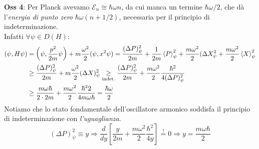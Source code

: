 \documentclass[../../FisicaTeorica.tex]{subfiles}
\begin{document}
\begin{enumerate}
\textbf{Oss 4}: Per Planck avevamo $\mathcal{E}_n \cong \hbar \omega n$, da cui manca un termine $\hbar \omega/2$, che dà l'\textit{energia di punto zero} $\hbar \omega (n+1/2)$, necessaria per il principio di indeterminazione.\\
Infatti $\forall \psi \in D(H)$:
\begin{align*}
(\psi, H\psi)&=\left(\psi, \frac{p^2}{2m}\psi\right) + m\frac{\omega^2}{2}(\psi, x^2\psi) = \frac{(\Delta P)^2_\psi}{2m}+ \frac{1}{2m}\left\langle{P}\right\rangle^2_\psi + \frac{m\omega^2}{2}(\Delta X^2_\psi + \frac{m\omega^2}{2}\left\langle{X}\right\rangle^2_\psi\\
&\geq \frac{(\Delta P)^2_\psi}{2m} + m\frac{\omega^2}{2}(\Delta X)^2_\psi \underset{\text{indet.}}{\geq} \frac{(\Delta P)^2_\psi}{2m} + \frac{m\omega^2}{2}\frac{\hbar^2}{4(\Delta P)^2_\psi} \\
&\geq \frac{m\omega \hbar }{2 \cdot 2m} + \frac{m\omega^2}{2} \frac{\hbar^2 2}{4m\omega \hbar} = \frac{\hbar\omega}{2}
\end{align*}
Notiamo che lo stato fondamentale dell'oscillatore armonico soddisfa il principio di indeterminazione con \textit{l'uguaglianza}.
\[
(\Delta P)^2_\psi \equiv y \Rightarrow \frac{d}{dy}\left[
\frac{y}{2m}+\frac{m\omega^2}{2}\frac{\hbar^2}{4y}
\right] \overset{!}{=} 0 \Rightarrow y =\frac{m\omega \hbar}{2}
\]
\end{enumerate}
\end{document}
